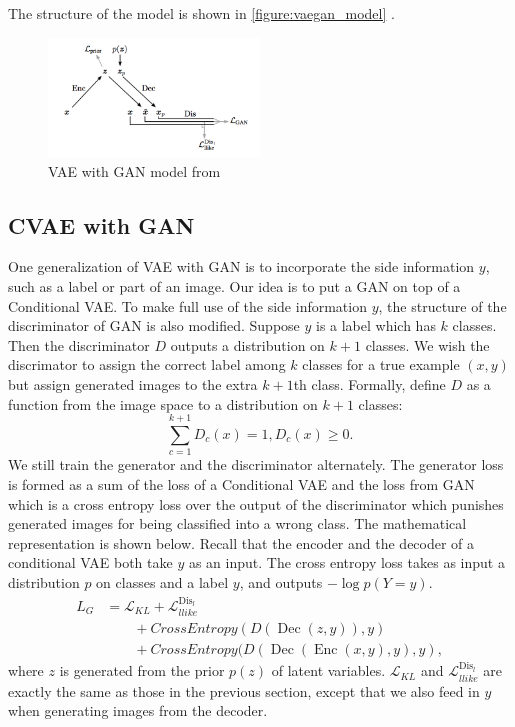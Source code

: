 \documentclass[10pt]{article}
\newcommand{\op}[1]{\operatorname{#1}}
\begin{document}
The structure of the model is shown in \autoref{figure:vaegan_model} \cite{larsen2015autoencoding}.

\begin{figure}[!ht]\centering
\includegraphics[width=0.5\textwidth]{images/vaegan2.png}
\caption{VAE with GAN model from \cite{larsen2015autoencoding}}
\label{figure:vaegan_model}
\end{figure}

\subsection{CVAE with GAN}
One generalization of VAE with GAN is to incorporate the side information $y$, such as a label or part of an image. Our idea is to put a GAN on top of a Conditional VAE. To make full use of the side information $y$, the structure of the discriminator of GAN is also modified. Suppose $y$ is a label which has $k$ classes. Then the discriminator $D$ outputs a distribution on $k+1$ classes. We wish the discrimator to assign the correct label among $k$ classes for a true example $(x,y)$ but assign generated images to the extra $k+1$th class. Formally, define $D$ as a function from the image space to a distribution on $k+1$ classes:
$$
\sum_{c=1}^{k+1} D_c(x) = 1, D_c(x) \geq 0.
$$
We still train the generator and the discriminator alternately. The generator loss is formed as a sum of the loss of a Conditional VAE and the loss from GAN which is a cross entropy loss over the output of the discriminator which punishes generated images for being classified into a wrong class. The mathematical representation is shown below. Recall that the encoder and the decoder of a conditional VAE both take $y$ as an input.
The cross entropy loss takes as input a distribution $p$ on classes and a label $y$, and outputs $-\log p(Y=y)$.
\begin{align}
L_G &= \mathcal{L}_{KL} + \mathcal{L}_{llike}^{\op{Dis}_l} \\
&\qquad +CrossEntropy(D(\op{Dec}(z,y)),y)\\
&\qquad +CrossEntropy(D(\op{Dec}(\op{Enc}(x,y),y),y),
\end{align}
where $z$ is generated from the prior $p(z)$ of latent variables. $\mathcal{L}_{KL}$ and $\mathcal{L}_{llike}^{\op{Dis}_l}$ are exactly the same as those in the previous section, except that we also feed in $y$ when generating images from the decoder.
\end{document}
